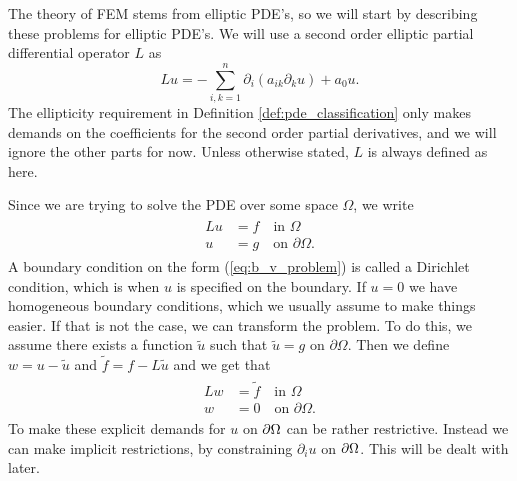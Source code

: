 \iffalse 
\section{Boundary or Initial Value Problems}
When working with ODE's,
whether a problem explicitly states the boundary conditions 
or the initial values does not affect whether a problem can be solved.
When working with 
PDE's that is no longer the case. The different types 
of PDE's demand differently posed problems. 


----THE ABOVE\@: SKAL DET OVERHOVEDET MED?----
\fi

The theory of FEM stems from elliptic PDE's, so we will start by
describing these problems for elliptic PDE's.
We will use a second order elliptic partial differential operator $L$ as 
\begin{equation}
    Lu = - \sum_{i,k=1}^n \partial_i(a_{ik} \partial_k u)+ a_0u.
    \label{eq:Lu}
\end{equation}
The ellipticity requirement in Definition \ref{def:pde_classification} only 
makes demands on the coefficients for the second order partial derivatives, 
and we will ignore the other parts for now. Unless otherwise stated, $L$ is 
always defined as here.
\iffalse
We therefore assume that we can write a general linear PDE of second 
order with $n$ variables as 
\begin{equation*}
    Lu = f.
\end{equation*}
\fi
Since we are trying to solve the PDE over some space $\Omega$, we write
\begin{align}
\begin{split}
    Lu &= f \quad \text{in } \Omega \label{eq:b_v_problem} \\
    u &= g \quad \text{on } \partial \Omega.
\end{split}
\end{align}
A boundary condition on the form (\ref{eq:b_v_problem}) is called a 
Dirichlet condition, which is when $u$ is specified on the boundary. 
If $u=0$ we have homogeneous boundary conditions, which we usually assume 
to make things easier. If that is not the case, we can
transform the problem. To do this, we assume there exists a function 
$\tilde{u}$ such that $\tilde{u}=g$ on $\partial \Omega$. Then we define 
$w = u - \tilde{u}$ and $\tilde{f}=f-L\tilde{u}$ and we get that
\begin{align}
\begin{split}
    Lw &= \tilde{f} \quad \text{in } \Omega \label{eq:b_v_problem_homogeneous} \\
    w &= 0 \quad \text{on } \partial \Omega. 
\end{split}
\end{align}
To make these explicit demands for $u$ on $\partial \Omega$ can 
be rather restrictive.
Instead we can make implicit restrictions, by constraining 
$\partial _i u$ on $\partial \Omega$.
This will be dealt with later.